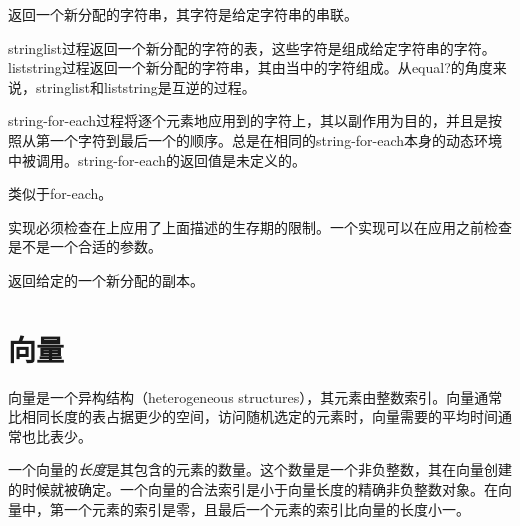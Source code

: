 \begin{entry}{%
}

返回一个新分配的字符串，其字符是给定字符串的串联。
\end{entry}


\begin{entry}{%
}

{\cf string\coerce{}list}过程返回一个新分配的字符的表，这些字符是组成给定字符串的字符。{\cf list\coerce{}string}过程返回一个新分配的字符串，其由当中的字符组成。从{\cf equal?}的角度来说，{\cf string\coerce{}list}和{\cf list\coerce{}string}是互逆的过程。
\end{entry}

\begin{entry}{%
}

{\cf string-for-each}过程将逐个元素地应用到的字符上，其以副作用为目的，并且是按照从第一个字符到最后一个的顺序。总是在相同的{\cf string-for-each}本身的动态环境中被调用。{\cf string-for-each}的返回值是未定义的。

类似于{\cf for-each}。

\implresp 实现必须检查在上应用了上面描述的生存期的限制。一个实现可以在应用之前检查是不是一个合适的参数。
\end{entry}

\begin{entry}{%
}

返回给定的一个新分配的副本。

\end{entry}

\section{向量}
\label{vectorsection}

向量是一个异构结构（heterogeneous structures），其元素由整数索引。向量通常比相同长度的表占据更少的空间，访问随机选定的元素时，向量需要的平均时间通常也比表少。

\vest 一个向量的{\em 长度}是其包含的元素的数量。这个数量是一个非负整数，其在向量创建的时候就被确定。一个向量的合法索引是小于向量长度的精确非负整数对象。在向量中，第一个元素的索引是零，且最后一个元素的索引比向量的长度小一。

